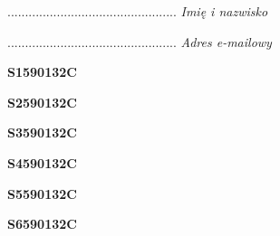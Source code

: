 \begin{turn}{90}\begin{minipage}{\linewidth} \vspace{20mm} ................................................  \textit{Imię i nazwisko}\end{minipage}\end{turn}

\begin{turn}{90}\begin{minipage}{\linewidth} \vspace{20mm} ................................................  \textit{Adres e-mailowy}\end{minipage}\end{turn}

\begin{turn}{90}\huge \begin{minipage}{\linewidth} \vspace{10mm}\textbf{S1590132C}\end{minipage}\end{turn}

\begin{turn}{90}\huge \begin{minipage}{\linewidth} \vspace{10mm}\textbf{S2590132C}\end{minipage}\end{turn}

\begin{turn}{90}\huge \begin{minipage}{\linewidth} \vspace{10mm}\textbf{S3590132C}\end{minipage}\end{turn}

\begin{turn}{90}\huge \begin{minipage}{\linewidth} \vspace{10mm}\textbf{S4590132C}\end{minipage}\end{turn}

\begin{turn}{90}\huge \begin{minipage}{\linewidth} \vspace{10mm}\textbf{S5590132C}\end{minipage}\end{turn}

\begin{turn}{90}\huge \begin{minipage}{\linewidth} \vspace{10mm}\textbf{S6590132C}\end{minipage}\end{turn}

